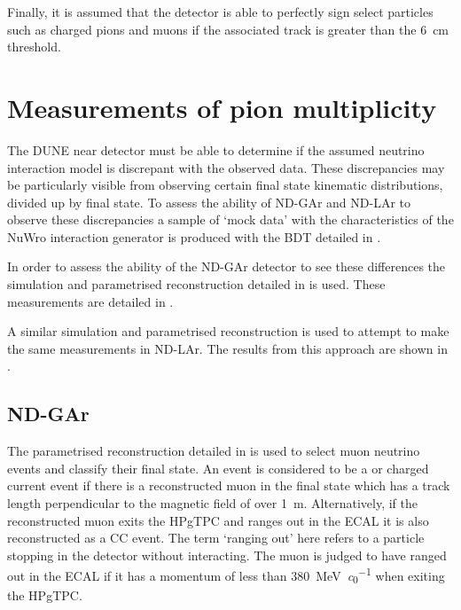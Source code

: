 Finally, it is assumed that the detector is able to perfectly sign select particles such as charged pions and muons if the associated track is greater than the \SI{6}{\cm} threshold.

\section{Measurements of pion multiplicity}
\label{sec:dune_ndrwt:pionMulti}

The DUNE near detector must be able to determine if the assumed neutrino interaction model is discrepant with the observed data.
These discrepancies may be particularly visible from observing certain final state kinematic distributions, divided up by final state.
To assess the ability of ND-GAr and ND-LAr to observe these discrepancies a sample of `mock data' with the characteristics of the NuWro interaction generator is produced with the BDT detailed in .

In order to assess the ability of the ND-GAr detector to see these differences the simulation and parametrised reconstruction detailed in  is used.
These measurements are detailed in .

A similar simulation and parametrised reconstruction is used to attempt to make the same measurements in ND-LAr. 
The results from this approach are shown in .

\subsection{ND-GAr}
\label{sec:dune_ndrwt:pionMulti:gar}

The parametrised reconstruction detailed in  is used to select muon neutrino events and classify their final state.
An event is considered to be a \numu or \anumu charged current event if there is a reconstructed muon in the final state which has a track length perpendicular to the magnetic field of over \SI{1}{\metre}.
Alternatively, if the reconstructed muon exits the HPgTPC and ranges out in the ECAL it is also reconstructed as a \numu CC event.
The term `ranging out' here refers to a particle stopping in the detector without interacting.
The muon is judged to have ranged out in the ECAL if it has a momentum of less than \SI{380}{\MeV\per\clight} when exiting the HPgTPC. 


